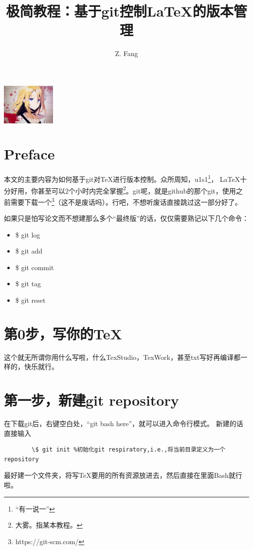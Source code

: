 \documentclass[cn,hazy,sakura,screen,14pt]{elegantnote}
\title{极简教程：基于git控制\LaTeX{}的\Tex{}版本管理}
\author{Z. Fang}
\institute{Chem. FDU}
\date{\zhtoday}
\begin{document}
	
	\maketitle
	
	\centerline{
		\includegraphics[width=0.2\textwidth]{55440964_p1.jpg}
	}
	
	
	\section{Preface}
	
	本文的主要内容为如何基于git对\TeX{}进行版本控制。众所周知，u1s1\footnote{“有一说一”}， \LaTeX{}十分好用，你甚至可以2个小时内完全掌握\footnote{大雾。指某本教程。}。git呢，就是github的那个git，使用之前需要下载一个\footnote{https://git-scm.com/}（这不是废话吗）。行吧，不想听废话直接跳过这一部分好了。
	
	如果只是怕写论文而不想建那么多个“最终版”的话，仅仅需要熟记以下几个命令：
	\begin{itemize}
		\item \$ git log
		\item \$ git add
		\item \$ git commit
		\item \$ git tag
		\item \$ git reset
	\end{itemize}
	
	
	\section{第0步，写你的\TeX{}}
	这个就无所谓你用什么写啦，什么TexStudio，TexWork，甚至txt写好再编译都一样的，快乐就行。

	\section{第一步，新建git repository}
	在下载git后，右键空白处，“git bash here”，就可以进入命令行模式。
	新建的话直接输入
	\begin{lstlisting}
		\$ git init %初始化git respiratory,i.e.,将当前目录定义为一个repository
	\end{lstlisting}	
	
	\begin{remark}
	最好建一个文件夹，将写\TeX{}要用的所有资源放进去，然后直接在里面Bash就行啦。
	\end{remark}
	
\end{document}
